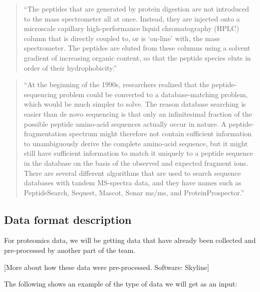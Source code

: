 \documentclass[
]{book}
\begin{document}
\begin{quote}
``The peptides that are generated by protein digestion are not introduced to the
mass spectrometer all at once. Instead, they are injected onto a microscale
capillary high-performance liquid chromatography (HPLC) column that is
directly coupled to, or is `on-line' with, the mass spectrometer. The peptides are
eluted from these columns using a solvent gradient of increasing organic content,
so that the peptide species elute in order of their hydrophobicity.'' \citep{steen2004abc}
\end{quote}

\begin{quote}
``At the beginning of the 1990s, researchers realized that the
peptide-sequencing problem could be converted to a database-matching problem,
which would be much simpler to solve. The reason database searching is easier
than de novo sequencing is that only an infinitesimal fraction of the possible
peptide amino-acid sequences actually occur in nature. A peptide-fragmentation
spectrum might therefore not contain sufficient information to unambiguously
derive the complete amino-acid sequence, but it might still have sufficient
information to match it uniquely to a peptide sequence in the database on the
basis of the observed and expected fragment ions. There are several different
algorithms that are used to search sequence databases with tandem MS-spectra
data, and they have names such as PeptideSearch, Sequest, Mascot, Sonar ms/ms,
and ProteinProspector.'' \citep{steen2004abc}
\end{quote}

\hypertarget{data-format-description}{%
\subsection{Data format description}\label{data-format-description}}

For proteomics data, we will be getting data that have already been collected and
pre-processed by another part of the team.

{[}More about how these data were pre-processed. Software: Skyline{]}

The following shows an example of the
type of data we will get as an input:
\end{document}
